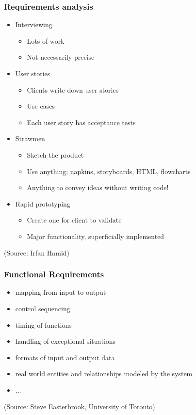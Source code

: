 \documentclass[10pt]{beamer}
\begin{document}
\begin{frame}[fragile]
  \frametitle{Requirements analysis}
  \begin{itemize}
  \item Interviewing
    \begin{itemize}
    \item Lots of work
    \item Not necessarily precise
    \end{itemize}
  \item User stories
    \begin{itemize}
    \item Clients write down user stories
    \item Use cases
    \item Each user story has acceptance tests
    \end{itemize}
  \item Strawmen
    \begin{itemize}
    \item Sketch the product
    \item Use anything; napkins, storyboards, HTML, flowcharts
    \item Anything to convey ideas without writing code!
    \end{itemize}
  \item Rapid prototyping
    \begin{itemize}
    \item Create one for client to validate
    \item Major functionality, superficially implemented
    \end{itemize}
  \end{itemize}
\tiny (Source: Irfan Hamid)
\end{frame}

\begin{frame}[fragile]
  \frametitle{Functional Requirements}
  \begin{itemize}
  \item mapping from input to output
  \item control sequencing
  \item timing of functions
  \item handling of exceptional situations
  \item formats of input and output data
  \item real world entities and relationships modeled by the system
  \item ...
  \end{itemize}
\tiny (Source: Steve Easterbrook, University of Toronto)
\end{frame}
\end{document}
